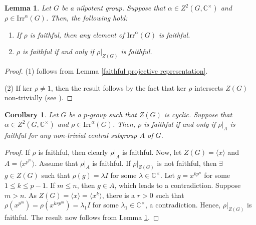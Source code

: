 \documentclass[a4paper,11pt]{amsart}
\numberwithin{equation}{section}
\numberwithin{equation}{subsection}
\newtheorem{corollary}[theorem]{Corollary}
\newtheorem{lemma}[theorem]{Lemma}
\newcommand{\C}{\mathbb{C}}
\begin{document}
	\begin{lemma} \label{restriction}
		Let $G$ be a nilpotent group. Suppose that $\alpha \in Z^2(G,\mathbb{C}^{\times})$ and $\rho \in \mathrm{Irr}^\alpha(G)$. Then, the following hold:
		\begin{enumerate}
			\item If $\rho$ is faithful, then any element of $\mathrm{Irr}^\alpha(G)$ is faithful.
			\item $\rho$ is faithful if and only if $\rho|_{Z(G)}$ is faithful. 
		\end{enumerate}
		
	\end{lemma}
	
	\begin{proof}
		(1) follows  from Lemma \ref{faithful projective representation}. 
		
		(2) If ker $\rho \neq 1$, then the result follows by the fact that ker $\rho$ intersects $Z(G)$ non-trivially (see \cite[Chapter 10, Lemma 1.7]{karpilovsky2}). 
		
	\end{proof}
	
	
	\begin{corollary} \label{restriction on A is faithful}
		Let $G$ be a $p$-group such that $Z(G)$ is cyclic. Suppose that $\alpha \in Z^2(G,\mathbb{C}^{\times})$ and $\rho \in \mathrm{Irr}^\alpha(G)$. Then, $\rho$ is faithful if and only if $\rho|_A$ is faithful for any non-trivial central subgroup $A$ of $G$.   
	\end{corollary}
	
	\begin{proof}
		If $\rho$ is faithful, then clearly $\rho|_A$ is faithful. Now, let $Z(G)= \langle x \rangle$ and $A= \langle x^{p^m} \rangle$. Assume that $\rho|_A$ is faithful. If $\rho|_{Z(G)}$ is not faithful, then $\exists$ $g \in Z(G)$ such that $\rho(g)= \lambda I$ for some $\lambda \in \C^\times$. Let $g= x^{kp^n}$ for some $1 \leq k \leq p-1$. If $m \leq n$, then $g \in A$, which leads to a contradiction. Suppose $m> n$. As $Z(G)=\langle x \rangle= \langle x^k \rangle$, there is a $r>0$ such that  $\rho(x^{p^m})= \rho(x^{krp^m})= \lambda_1 I$ for some $\lambda_1 \in \C^\times$, a contradiction.  
		Hence, $\rho|_{Z(G)}$ is faithful. The result now follows from Lemma \ref{restriction}.
	\end{proof}
	
\end{document}
